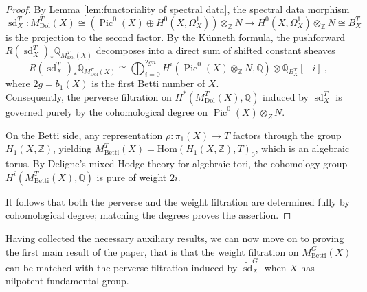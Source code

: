 \documentclass[11pt, a4paper]{amsart}
\theoremstyle{definition}
\theoremstyle{myitemstyle}
\newcommand{\Z}{\mathbb{Z}}
\DeclareMathOperator{\Pic}{Pic}
\newcommand{\Dol}{{\mathrm{Dol}}}
\newcommand{\Betti}{{\mathrm{Betti}}}
\newcommand{\sd}{{\operatorname{sd}}}
\begin{document}
\begin{proof}
By Lemma \ref{lem:functoriality of spectral data}, the spectral data morphism
\[
    \sd^T_X\colon M^T_\Dol(X)\cong (\Pic^0(X)\oplus H^0(X,\Omega^1_X))\otimes_\Z N \to H^0(X,\Omega^1_X)\otimes_\Z N \cong B^T_X
\]
is the projection to the second factor.
By the K\"unneth formula, the pushforward $R(\sd^{T}_X)_* \mathbb{Q}_{M_{\Dol}^{T}(X)}$ decomposes into a direct sum of shifted constant sheaves 
\[
    R(\sd^{T}_{X})_* \mathbb{Q}_{M_{\Dol}^{T}(X)}\cong \bigoplus_{i=0}^{2gn} H^i(\operatorname{Pic}^0(X)\otimes_\Z N, \mathbb{Q}) \otimes \mathbb{Q}_{B^T_X}[-i]\ ,
\]
where $2g=b_1(X)$ is the first Betti number of $X$.\\
Consequently, the perverse filtration on $H^*(M_{\Dol}^{T}(X), \mathbb{Q})$ induced by $\sd^T_{X}$ is governed purely by the cohomological degree on $\operatorname{Pic}^0(X)\otimes_{Z}N$.

On the Betti side, any representation $\rho\colon \pi_1(X) \to T$ factors through the group $H_1(X, \mathbb{Z})$, yielding $M_{\operatorname{Betti}}^{T}(X)=\mathrm{Hom}(H_1(X, \mathbb{Z}),T)_0$, which is an algebraic torus. By Deligne's mixed Hodge theory for algebraic tori, the cohomology group $H^i(M_{\Betti}^{T}(X), \mathbb{Q})$
is pure of weight $2i$. 

It follows that both the perverse and the weight filtration are determined fully by cohomological degree; matching the degrees proves the assertion.
\end{proof}
 
Having collected the necessary auxiliary results, we can now move on to proving the first main result of the paper, that is that the weight filtration on $M^G_\Betti(X)$ can be matched with the perverse filtration induced by $\widetilde\sd^G_X$ when $X$ has nilpotent fundamental group. 
\end{document}
